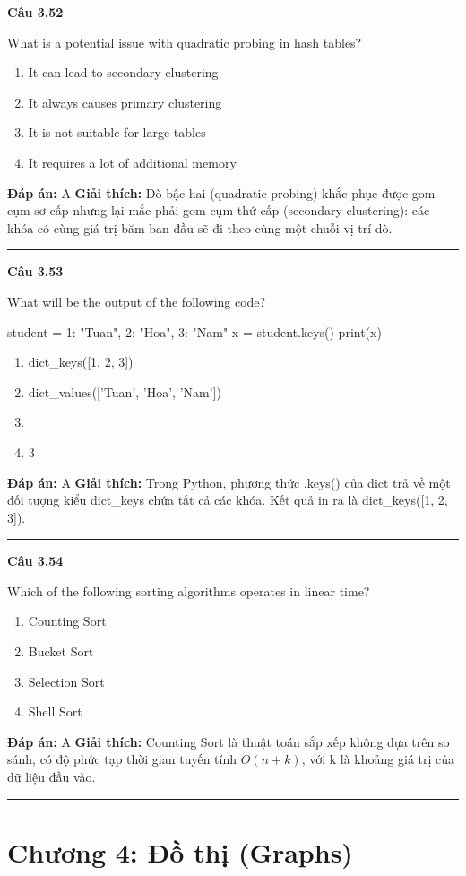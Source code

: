 \documentclass[11pt,a4paper]{article}
\newenvironment{question}[1]{%
  \par\vspace{1em}\noindent\textbf{\large Câu #1}\par\vspace{0.4em}
}{%
  \par\vspace{1em}\hrule\vspace{0.6em}
}
\newenvironment{choices}{%
  \begin{enumerate}[label=\textbf{\Alph*.},leftmargin=2.2em,itemsep=2pt,topsep=3pt]
}{%
  \end{enumerate}
}
\newcommand{\choice}{\item}
\newenvironment{codebox}{%
  \begin{tcolorbox}[colback=gray!8!white,colframe=gray!50!black,arc=1.5mm,boxrule=0.6pt,left=3mm,right=3mm,top=2.5mm,bottom=2.5mm]
  \ttfamily\small
}{%
  \end{tcolorbox}
}
\begin{document}
\begin{question}{3.52}
What is a potential issue with quadratic probing in hash tables?
\begin{choices}
\choice It can lead to secondary clustering
\choice It always causes primary clustering
\choice It is not suitable for large tables
\choice It requires a lot of additional memory
\end{choices}
\textbf{Đáp án:} A
\textbf{Giải thích:} Dò bậc hai (quadratic probing) khắc phục được gom cụm sơ cấp nhưng lại mắc phải gom cụm thứ cấp (secondary clustering): các khóa có cùng giá trị băm ban đầu sẽ đi theo cùng một chuỗi vị trí dò.
\end{question}

\begin{question}{3.53}
What will be the output of the following code?
\begin{codebox}
student = {1: "Tuan", 2: "Hoa", 3: "Nam"}
x = student.keys()
print(x)
\end{codebox}
\begin{choices}
\choice dict_keys([1, 2, 3])
\choice dict_values(['Tuan', 'Hoa', 'Nam'])
\choice [1: "Tuan", 2: "Hoa", 3: "Nam"]
\choice 3
\end{choices}
\textbf{Đáp án:} A
\textbf{Giải thích:} Trong Python, phương thức .keys() của dict trả về một đối tượng kiểu dict_keys chứa tất cả các khóa. Kết quả in ra là dict_keys([1, 2, 3]).
\end{question}

\begin{question}{3.54}
Which of the following sorting algorithms operates in linear time?
\begin{choices}
\choice Counting Sort
\choice Bucket Sort
\choice Selection Sort
\choice Shell Sort
\end{choices}
\textbf{Đáp án:} A
\textbf{Giải thích:} Counting Sort là thuật toán sắp xếp không dựa trên so sánh, có độ phức tạp thời gian tuyến tính $O(n + k)$, với k là khoảng giá trị của dữ liệu đầu vào.
\end{question}

\newpage
\section*{Chương 4: Đồ thị (Graphs)}
\end{document}
